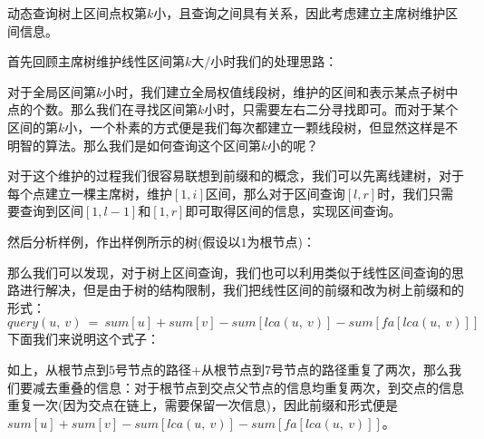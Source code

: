 \documentclass[]{article}
\begin{document}
动态查询树上区间点权第\(k\)小，且查询之间具有关系，因此考虑建立主席树维护区间信息。

首先回顾主席树维护线性区间第\(k\)大/小时我们的处理思路：

对于全局区间第\(k\)小时，我们建立全局权值线段树，维护的区间和表示某点子树中点的个数。那么我们在寻找区间第\(k\)小时，只需要左右二分寻找即可。而对于某个区间的第\(k\)小，一个朴素的方式便是我们每次都建立一颗线段树，但显然这样是不明智的算法。那么我们是如何查询这个区间第\(k\)小的呢？

对于这个维护的过程我们很容易联想到前缀和的概念，我们可以先离线建树，对于每个点建立一棵主席树，维护\([1, i]\)区间，那么对于区间查询\([l, r]\)时，我们只需要查询到区间\([1, l - 1]\)和\([1, r]\)即可取得区间的信息，实现区间查询。

然后分析样例，作出样例所示的树(假设以\(1\)为根节点)：

那么我们可以发现，对于树上区间查询，我们也可以利用类似于线性区间查询的思路进行解决，但是由于树的结构限制，我们把线性区间的前缀和改为树上前缀和的形式：
\(query(u,\ v)\ =\ sum[u]+sum[v]-sum[lca(u,\ v)]-sum[fa[lca(u,\ v)]]\)
下面我们来说明这个式子：

如上，从根节点到\(5\)号节点的路径+从根节点到\(7\)号节点的路径重复了两次，那么我们要减去重叠的信息：对于根节点到交点父节点的信息均重复两次，到交点的信息重复一次(因为交点在链上，需要保留一次信息)，因此前缀和形式便是\(sum[u]+sum[v]-sum[lca(u,\ v)]-sum[fa[lca(u,\ v)]]\)。
\end{document}
